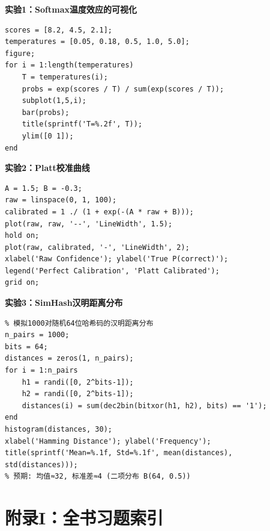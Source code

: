 \documentclass[11pt,a4paper]{ctexart}
\begin{document}
\textbf{实验1：Softmax温度效应的可视化}
\begin{verbatim}
scores = [8.2, 4.5, 2.1];
temperatures = [0.05, 0.18, 0.5, 1.0, 5.0];
figure;
for i = 1:length(temperatures)
    T = temperatures(i);
    probs = exp(scores / T) / sum(exp(scores / T));
    subplot(1,5,i);
    bar(probs);
    title(sprintf('T=%.2f', T));
    ylim([0 1]);
end
\end{verbatim}

\textbf{实验2：Platt校准曲线}
\begin{verbatim}
A = 1.5; B = -0.3;
raw = linspace(0, 1, 100);
calibrated = 1 ./ (1 + exp(-(A * raw + B)));
plot(raw, raw, '--', 'LineWidth', 1.5);
hold on;
plot(raw, calibrated, '-', 'LineWidth', 2);
xlabel('Raw Confidence'); ylabel('True P(correct)');
legend('Perfect Calibration', 'Platt Calibrated');
grid on;
\end{verbatim}

\textbf{实验3：SimHash汉明距离分布}
\begin{verbatim}
% 模拟1000对随机64位哈希码的汉明距离分布
n_pairs = 1000;
bits = 64;
distances = zeros(1, n_pairs);
for i = 1:n_pairs
    h1 = randi([0, 2^bits-1]);
    h2 = randi([0, 2^bits-1]);
    distances(i) = sum(dec2bin(bitxor(h1, h2), bits) == '1');
end
histogram(distances, 30);
xlabel('Hamming Distance'); ylabel('Frequency');
title(sprintf('Mean=%.1f, Std=%.1f', mean(distances), std(distances)));
% 预期: 均值≈32, 标准差≈4 (二项分布 B(64, 0.5))
\end{verbatim}

\newpage

\section*{附录I：全书习题索引}
\end{document}
